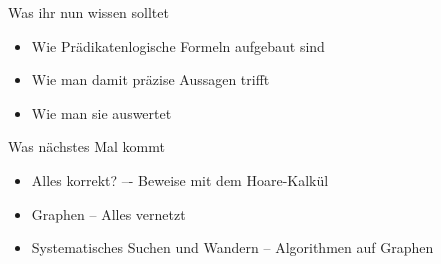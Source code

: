 



\thassedaniel{
%	
%	
}{
%	
%	
}

\begin{frame}	
	\begin{block}{Was ihr nun wissen solltet}
		\begin{itemize}
			\item Wie Prädikatenlogische Formeln aufgebaut sind
			\item Wie man damit präzise Aussagen trifft
			\item Wie man sie auswertet
		\end{itemize}
	\end{block}
	
	\begin{block}{Was nächstes Mal kommt}
		\begin{itemize}
			\item Alles korrekt? –- Beweise mit dem Hoare-Kalkül
			\item Graphen -- Alles vernetzt
			\item Systematisches Suchen und Wandern -- Algorithmen auf Graphen
		\end{itemize}
	\end{block}
\end{frame}

\slideThanks

